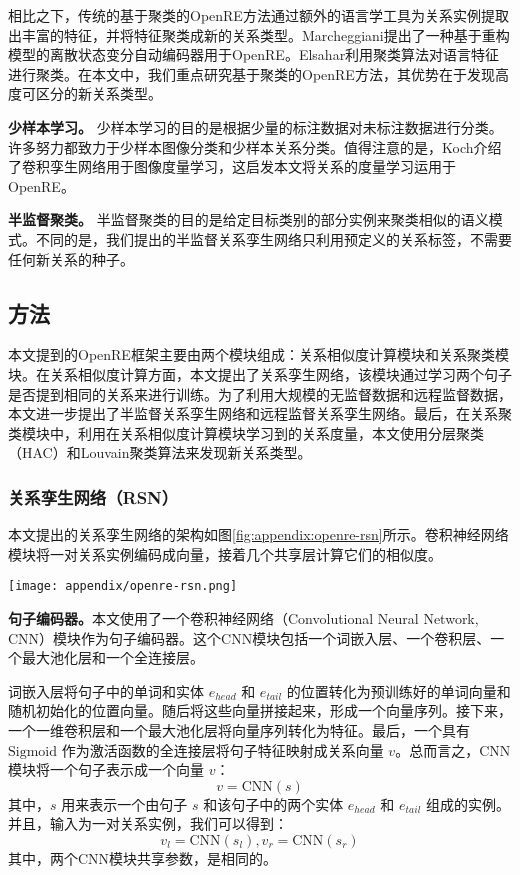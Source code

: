 \begin{translation}
相比之下，传统的基于聚类的OpenRE方法通过额外的语言学工具为关系实例提取出丰富的特征，并将特征聚类成新的关系类型。Marcheggiani提出了一种基于重构模型的离散状态变分自动编码器用于OpenRE。Elsahar利用聚类算法对语言特征进行聚类。在本文中，我们重点研究基于聚类的OpenRE方法，其优势在于发现高度可区分的新关系类型。

\textbf{少样本学习。} 少样本学习的目的是根据少量的标注数据对未标注数据进行分类。许多努力都致力于少样本图像分类和少样本关系分类。值得注意的是，Koch介绍了卷积孪生网络用于图像度量学习，这启发本文将关系的度量学习运用于OpenRE。

\textbf{半监督聚类。} 半监督聚类的目的是给定目标类别的部分实例来聚类相似的语义模式。不同的是，我们提出的半监督关系孪生网络只利用预定义的关系标签，不需要任何新关系的种子。


\subsection{方法}
本文提到的OpenRE框架主要由两个模块组成：关系相似度计算模块和关系聚类模块。在关系相似度计算方面，本文提出了关系孪生网络，该模块通过学习两个句子是否提到相同的关系来进行训练。为了利用大规模的无监督数据和远程监督数据，本文进一步提出了半监督关系孪生网络和远程监督关系孪生网络。最后，在关系聚类模块中，利用在关系相似度计算模块学习到的关系度量，本文使用分层聚类（HAC）和Louvain聚类算法来发现新关系类型。

\subsubsection{关系孪生网络（RSN）}
本文提出的关系孪生网络的架构如图\ref{fig:appendix:openre-rsn}所示。卷积神经网络模块将一对关系实例编码成向量，接着几个共享层计算它们的相似度。

\begin{figure*}
	\centering
	\texttt{[image: appendix/openre-rsn.png]}
	\caption{关系孪生网络的架构。输出为两个关系事实的相似度。}
	\label{fig:appendix:openre-rsn}
\end{figure*}

\textbf{句子编码器。}本文使用了一个卷积神经网络（Convolutional Neural Network, CNN）模块作为句子编码器。这个CNN模块包括一个词嵌入层、一个卷积层、一个最大池化层和一个全连接层。

词嵌入层将句子中的单词和实体 $e_{head}$ 和 $e_{tail}$ 的位置转化为预训练好的单词向量和随机初始化的位置向量。随后将这些向量拼接起来，形成一个向量序列。接下来，一个一维卷积层和一个最大池化层将向量序列转化为特征。最后，一个具有 $\text{Sigmoid}$ 作为激活函数的全连接层将句子特征映射成关系向量 $v$。总而言之，CNN模块将一个句子表示成一个向量 $v$：
\begin{equation}
	v = \text{CNN}(s)
\end{equation}
其中，$s$ 用来表示一个由句子 $s$ 和该句子中的两个实体 $e_{head}$ 和 $e_{tail}$ 组成的实例。并且，输入为一对关系实例，我们可以得到：
\begin{equation}
	v_l = \text{CNN}(s_l), v_r = \text{CNN}(s_r)
\end{equation}
其中，两个CNN模块共享参数，是相同的。


\end{translation}
